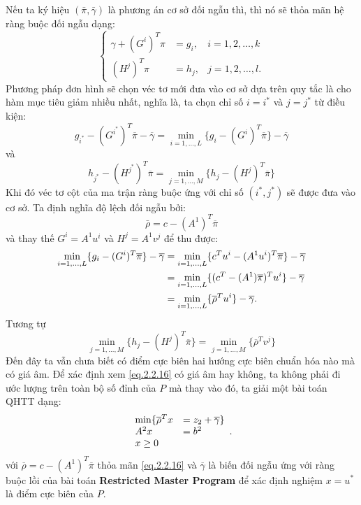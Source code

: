 Nếu ta ký hiệu $(\bar \pi,\bar\gamma)$ là phương án cơ sở đối ngẫu thì, thì nó sẽ thỏa mãn hệ ràng buộc đối ngẫu dạng:
\begin{equation}\label{eq.2.2.13}
\left\{ \begin{array}{lll}
\gamma + (G^i)^T \pi &= g_i, &i = 1,2, \ldots, k\\
        (H^j)^T \pi &= h_j, &j = 1,2, \ldots, l.
\end{array} \right .
\end{equation}
Phương pháp đơn hình sẽ chọn véc tơ mới đưa vào cơ sở dựa trên quy tắc là cho hàm mục tiêu giảm nhiều nhất, nghĩa là, ta chọn chỉ số $i=i^{*}$ và $j=j^{*}$ từ điều kiện:
\begin{equation}\label{eq.2.2.14}
g_{i^\ast} - (G^{i^\ast})^T \overline \pi - \overline \gamma = \min_{i = 1, \ldots, L} \{ g_i - (G^i)^T \overline \pi \} - \overline \gamma
\end{equation}
và
\begin{equation}\label{eq.2.2.15}
h_{j^\ast} - (H^{j^\ast})^T \overline \pi = \min_{j = 1, \ldots, M} \{ h_j - (H^j)^T \overline \pi \}
\end{equation}
Khi đó véc tơ cột của ma trận ràng buộc ứng với chỉ số $(i^{*}, j^{*})$ sẽ được đưa vào cơ sở. Ta định nghĩa độ lệch đối ngẫu bởi:
\begin{equation}\label{eq.2.2.16}
\bar\rho  = c - (A^1)^T \overline \pi
\end{equation}
và thay thế $G^i = A^1u^i$ và $H^j = A^1v^j$ để thu được:
\begin{align}\label{eq.2.2.17}
\min_{i = 1, \ldots, L} \{g_i - (G^i)^T \overline \pi \} - \overline \gamma
            &= \min_{i = 1, \ldots, L} \{ c^Tu^i - (A^1u^i)^T \overline \pi \} - \overline \gamma\notag\\
            &= \min_{i = 1, \ldots, L} \{ (c^T - (A^1)\overline \pi)^Tu^i \} - \overline \gamma\notag\\
            &= \min_{i = 1, \ldots, L} \{ \overline \rho^T u^i \} - \overline \gamma\notag.
\end{align}
Tương tự
\begin{equation}\label{eq.2.2.18}
\min_{j = 1, \ldots, M} \{h_j - (H^j)^T \overline \pi \} = \min_{j = 1, \ldots, M} \{ \overline \rho^T v^j \} 
\end{equation}
Đến đây ta vẫn chưa biết có điểm cực biên hai hướng cực biên chuẩn hóa nào mà có giá âm. Để xác định xem \eqref{eq.2.2.16} có giá âm hay không, ta không phải đi ước lượng trên toàn bộ số đỉnh của $P$ mà thay vào đó, ta giải một bài toán QHTT dạng:
\begin{equation}\label{eq.2.2.18}
 \begin{array}{ll}
\min\{ \overline \rho^Tx &= z_2 + \overline \gamma\}\\
A^2x &= b^2\\
x \geq 0
\end{array}  .
\end{equation}
với $\overline \rho = c - (A^1)^T \overline \pi$ thỏa mãn \eqref{eq.2.2.16} và $\overline \gamma$ là biến đối ngẫu ứng với ràng buộc lồi của bài toán {\bf Restricted Master Program} để xác định nghiệm $x=u^{*}$ là điểm cực biên của $P$.

